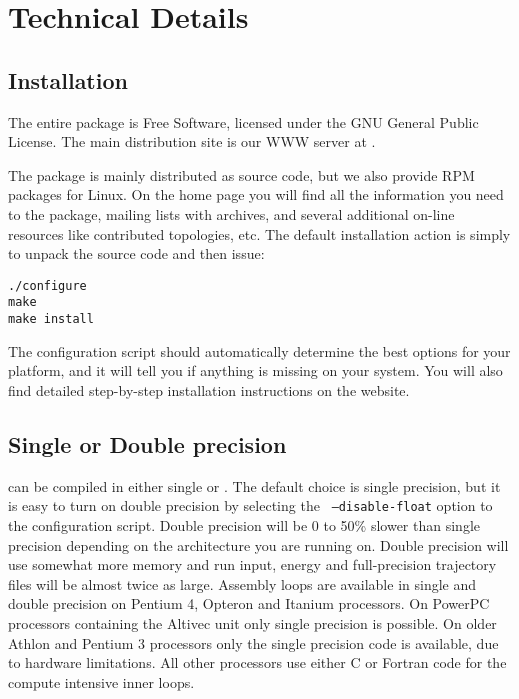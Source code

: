 %
% 
% 
% 
% 
% 
% 
% 
% 
%

\chapter{Technical Details}
\label{ch:install}
\section{Installation}
The entire {\gromacs} package is Free Software, licensed under the GNU
General Public License. The main distribution site is our WWW server at
{\wwwpage}. 

The package is mainly distributed as source code, but we also provide
RPM packages for Linux.
On the home page you will find all the information you need to 
 the package, mailing lists with archives,
and several additional on-line resources like contributed topologies, etc.
The default installation action is simply to unpack the source code and
then issue:
\begin{verbatim}
./configure
make
make install
\end{verbatim}
The configuration script should automatically determine the best options
for your platform, and it will tell you if anything is missing on
your system. You will also find detailed step-by-step installation
instructions on the website.

\section{Single or Double precision}
{\gromacs} can be compiled in either single or
. The default choice is single precision,
but it is easy to turn on double precision by selecting the {\tt
--disable-float} option to the configuration script.  Double precision
will be 0 to 50\% slower than single precision depending on the
architecture you are running on. Double precision will use somewhat
more memory and run input, energy and full-precision trajectory files
will be almost twice as large.  Assembly loops are available in single
and double precision on Pentium 4, Opteron and Itanium processors.  On
PowerPC processors containing the Altivec unit only single precision
is possible. On older Athlon and Pentium 3 processors only the single
precision code is available, due to hardware limitations. All other
processors use either C or Fortran code for the compute intensive
inner loops.

